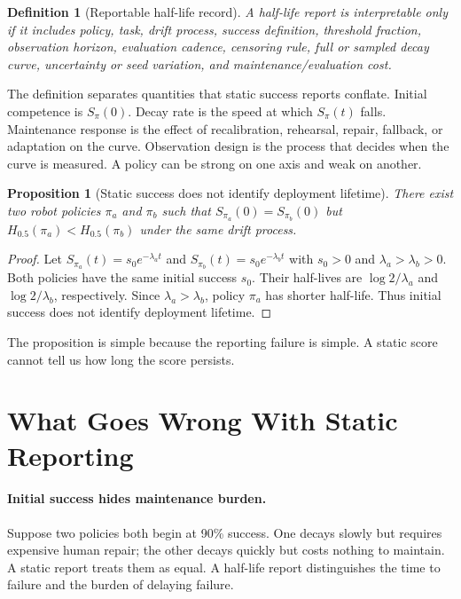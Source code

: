 \documentclass{article}
\newtheorem{definition}{Definition}
\newtheorem{proposition}{Proposition}
\newcommand{\half}{H_{0.5}}
\begin{document}
\begin{definition}[Reportable half-life record]
A half-life report is interpretable only if it includes policy, task, drift
process, success definition, threshold fraction, observation horizon, evaluation
cadence, censoring rule, full or sampled decay curve, uncertainty or seed
variation, and maintenance/evaluation cost.
\end{definition}

The definition separates quantities that static success reports conflate.
Initial competence is $S_\pi(0)$. Decay rate is the speed at which
$S_\pi(t)$ falls. Maintenance response is the effect of recalibration,
rehearsal, repair, fallback, or adaptation on the curve. Observation design is
the process that decides when the curve is measured. A policy can be strong on
one axis and weak on another.

\begin{proposition}[Static success does not identify deployment lifetime]
There exist two robot policies $\pi_a$ and $\pi_b$ such that
$S_{\pi_a}(0)=S_{\pi_b}(0)$ but $\half(\pi_a) < \half(\pi_b)$ under the same
drift process.
\end{proposition}

\begin{proof}
Let $S_{\pi_a}(t)=s_0 e^{-\lambda_a t}$ and
$S_{\pi_b}(t)=s_0 e^{-\lambda_b t}$ with $s_0>0$ and
$\lambda_a>\lambda_b>0$. Both policies have the same initial success $s_0$.
Their half-lives are $\log 2 / \lambda_a$ and $\log 2 / \lambda_b$,
respectively. Since $\lambda_a>\lambda_b$, policy $\pi_a$ has shorter
half-life. Thus initial success does not identify deployment lifetime.
\end{proof}

The proposition is simple because the reporting failure is simple. A static
score cannot tell us how long the score persists.

\section{What Goes Wrong With Static Reporting}

\paragraph{Initial success hides maintenance burden.}
Suppose two policies both begin at 90\% success. One decays slowly but requires
expensive human repair; the other decays quickly but costs nothing to maintain.
A static report treats them as equal. A half-life report distinguishes the time
to failure and the burden of delaying failure.
\end{document}
